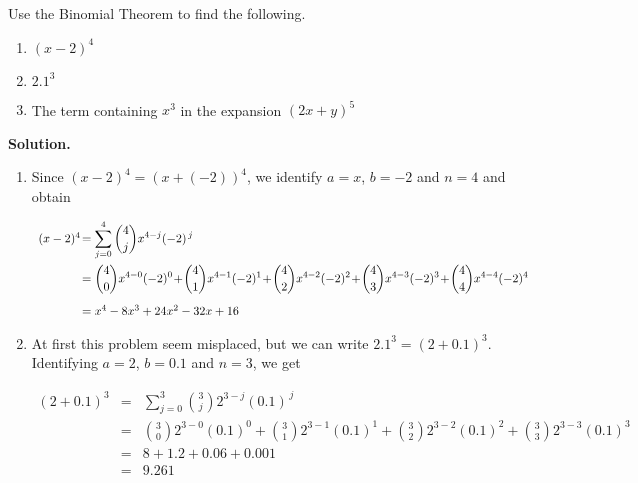 \documentclass{ximera}
\begin{document}
\begin{example} \label{binomialthmex}  Use the Binomial Theorem to find the following.

\begin{enumerate}

\item  $(x-2)^4$

\item  $2.1^{3}$


\item  The term containing $x^3$ in the expansion $(2x+y)^{5}$

\end{enumerate}

{\bf Solution.}
\begin{enumerate}
\item  Since $(x-2)^4 = (x+(-2))^4$, we identify $a = x$, $b = -2$ and $n=4$ and obtain

\[ \begin{array}{rcl}

(x-2)^4\! &\hspace{-.1in} =  & \hspace{-.1in}\displaystyle{\sum_{j=0}^{4} \binom{4}{j} x^{4-j} (-2)^{\, j}} \\ [15pt]
        & \hspace{-.1in} =  & \hspace{-.1in}\displaystyle{\binom{4}{0} x^{4-0} (-2)^{0} \!+\! \binom{4}{1} x^{4-1} (-2)^{1} \!+\! \binom{4}{2} x^{4-2} (-2)^{2} \!+\! \binom{4}{3} x^{4-3} (-2)^{3} \!+\! \binom{4}{4} x^{4-4} (-2)^{4}} \\ [15pt]
        &\hspace{-.1in}  =  & \hspace{-.1in}x^4 -8x^3 + 24x^2 - 32x + 16 \\
\end{array} \]

\item  At first this problem seem misplaced, but we can write $2.1^{3} = (2 + 0.1)^3$.  Identifying $a =2$, $b = 0.1$ and $n=3$, we get

\[ \begin{array}{rcl}

(2+0.1)^3 & = & \displaystyle{\sum_{j=0}^{3} \binom{3}{j} 2^{3-j} (0.1) ^{\, j}} \\ [15pt]
        & = & \displaystyle{\binom{3}{0} 2^{3-0}(0.1)^{0} + \binom{3}{1} 2^{3-1} (0.1)^{1} + \binom{3}{2} 2^{3-2}(0.1)^{2} + \binom{3}{3} 2^{3-3}(0.1)^{3}} \\ [15pt]
        & = & 8 + 1.2 + 0.06 + 0.001 \\
        & = & 9.261 \\
\end{array} \]


\end{enumerate}
\end{example}
\end{document}

